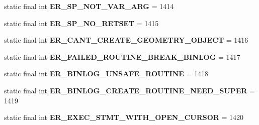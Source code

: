 \begin{DoxyCompactItemize}
\item 
\mbox{\label{classcom_1_1mysql_1_1cj_1_1exceptions_1_1_mysql_error_numbers_a4791727c928c8c4546c5b8b709701755}} 
static final int {\bfseries E\+R\+\_\+\+S\+P\+\_\+\+N\+O\+T\+\_\+\+V\+A\+R\+\_\+\+A\+RG} = 1414
\item 
\mbox{\label{classcom_1_1mysql_1_1cj_1_1exceptions_1_1_mysql_error_numbers_a2e3a95d184d2761a47325a2b03f61a8c}} 
static final int {\bfseries E\+R\+\_\+\+S\+P\+\_\+\+N\+O\+\_\+\+R\+E\+T\+S\+ET} = 1415
\item 
\mbox{\label{classcom_1_1mysql_1_1cj_1_1exceptions_1_1_mysql_error_numbers_aba54ce5fa2f177ab3f978c7c1e01ad80}} 
static final int {\bfseries E\+R\+\_\+\+C\+A\+N\+T\+\_\+\+C\+R\+E\+A\+T\+E\+\_\+\+G\+E\+O\+M\+E\+T\+R\+Y\+\_\+\+O\+B\+J\+E\+CT} = 1416
\item 
\mbox{\label{classcom_1_1mysql_1_1cj_1_1exceptions_1_1_mysql_error_numbers_ab3a88c4d0ee379a76fcdc753705e91ab}} 
static final int {\bfseries E\+R\+\_\+\+F\+A\+I\+L\+E\+D\+\_\+\+R\+O\+U\+T\+I\+N\+E\+\_\+\+B\+R\+E\+A\+K\+\_\+\+B\+I\+N\+L\+OG} = 1417
\item 
\mbox{\label{classcom_1_1mysql_1_1cj_1_1exceptions_1_1_mysql_error_numbers_a167d4ed465e6eb0f320f2550173bd1bf}} 
static final int {\bfseries E\+R\+\_\+\+B\+I\+N\+L\+O\+G\+\_\+\+U\+N\+S\+A\+F\+E\+\_\+\+R\+O\+U\+T\+I\+NE} = 1418
\item 
\mbox{\label{classcom_1_1mysql_1_1cj_1_1exceptions_1_1_mysql_error_numbers_a2b9158f21f5f54410d280dabcb36909c}} 
static final int {\bfseries E\+R\+\_\+\+B\+I\+N\+L\+O\+G\+\_\+\+C\+R\+E\+A\+T\+E\+\_\+\+R\+O\+U\+T\+I\+N\+E\+\_\+\+N\+E\+E\+D\+\_\+\+S\+U\+P\+ER} = 1419
\item 
\mbox{\label{classcom_1_1mysql_1_1cj_1_1exceptions_1_1_mysql_error_numbers_acff878dfc25e2ba0ac41005e90b9c935}} 
static final int {\bfseries E\+R\+\_\+\+E\+X\+E\+C\+\_\+\+S\+T\+M\+T\+\_\+\+W\+I\+T\+H\+\_\+\+O\+P\+E\+N\+\_\+\+C\+U\+R\+S\+OR} = 1420

\end{DoxyCompactItemize}
